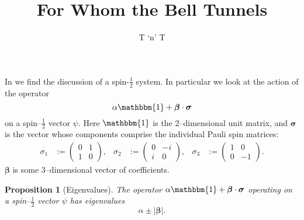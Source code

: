 \documentclass[12pt]{article}
\title{For Whom the Bell Tunnels}
\author{T `n' T}
\newtheorem{prop}[thm]{Proposition}
\begin{document}
\maketitle
\listoftodos

\bigskip

In \cite[p.448]{Bell1966} we find the discussion of a spin-$\frac{1}{2}$ system.  In particular we look at the action of the operator
\begin{displaymath}
  \alpha \mathbbm{1} + \bm{\beta} \cdot \bm{\sigma}
\end{displaymath}
on a spin--$\frac{1}{2}$ vector $\psi$.  Here $\mathbbm{1}$ is the 2--dimensional unit matrix, and $\bm{\sigma}$ is the vector whose components comprise the individual Pauli spin matrices:
\begin{align*}
  \sigma_1 &:= \begin{pmatrix}
                 0 & 1 \\
                 1 & 0
               \end{pmatrix},
              &
  \sigma_2 &:= \begin{pmatrix}
                 0 & -i \\
                 i & 0
               \end{pmatrix},
              &
  \sigma_3 &:= \begin{pmatrix}
                 1 & 0 \\
                 0 & -1
               \end{pmatrix}.
\end{align*}
$\bm{\beta}$ is some 3--dimensional vector of coefficients.

\begin{prop}[Eigenvalues]
  The operator $\alpha \mathbbm{1} + \bm{\beta} \cdot \bm{\sigma}$ operating on a spin--$\frac{1}{2}$ vector $\psi$ has eigenvalues
  \begin{displaymath}
    \alpha \pm |\bm{\beta}|.
  \end{displaymath}
\end{prop}
\end{document}
